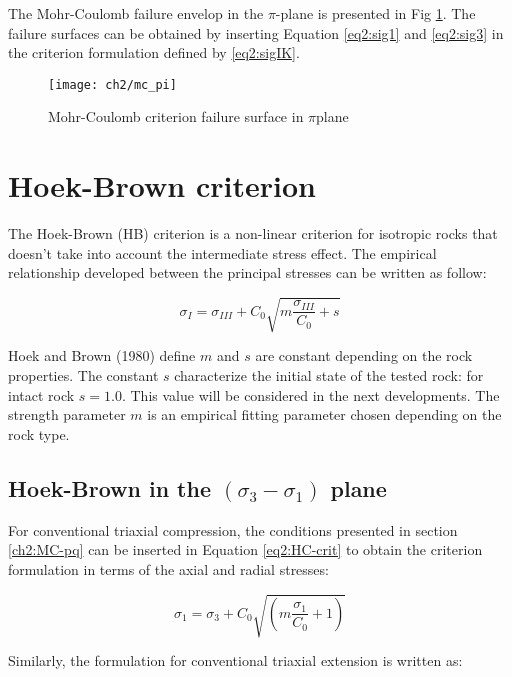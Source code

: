 The Mohr-Coulomb failure envelop in the $\pi$-plane is presented in Fig \ref{fig2:mc_pi}. The failure surfaces can be obtained by inserting Equation \ref{eq2:sig1} and \ref{eq2:sig3} in the criterion formulation defined by \ref{eq2:sigIK}. 

\begin{figure}[tb]
    \centering
    \texttt{[image: ch2/mc\_pi]}
    \caption{Mohr-Coulomb criterion failure surface in  $\pi$plane}
    \label{fig2:mc_pi}
\end{figure} 

\section{Hoek-Brown criterion}

The Hoek-Brown (HB) criterion is a non-linear criterion for isotropic rocks that doesn’t take into account the intermediate stress effect. The empirical relationship developed between the principal stresses can be written as follow:

\begin{equation}\label{eq2:HC-crit}
    \sigma_{I}=\sigma_{I I I}+C_{0} \sqrt{m \frac{\sigma_{I I I}}{C_{0}}+s}
\end{equation}

Hoek and Brown (1980) \cite{Hoek1980} define $m$ and $s$  are constant depending on the rock properties. The constant $s$ characterize the initial state of the tested rock: for intact rock $s=1.0$. This value will be considered in the next developments. The strength parameter $m$ is an empirical fitting parameter chosen depending on the rock type. 

\subsection{Hoek-Brown in the \texorpdfstring{$(\sigma_3 -\sigma_1)$}{sigma 3 - sigma 1} plane}

For conventional triaxial compression, the conditions presented in section \ref{ch2:MC-pq} can be inserted in Equation \ref{eq2:HC-crit} to obtain the criterion formulation in terms of the axial and radial stresses:

\begin{equation}\label{eq2:HBsig1}
    \sigma_{1}=\sigma_{3}+C_{0} \sqrt{\left(m \frac{\sigma_{1}}{C_{0}}+1\right)}
\end{equation}

Similarly, the formulation for conventional triaxial extension is written as:


